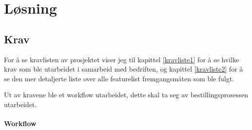 \chapter{Løsning}

\section{Krav}
For å se kravlisten av prosjektet viser jeg til kapittel \ref{kravliste1} for å se hvilke krav som ble utarbeidet i samarbeid med bedriften, og kapittel \ref{kravliste2} for å se den mer detaljerte liste over alle  featurelist fremgangsmåten som ble fulgt.

Ut av kravene ble et workflow utarbeidet, dette skal ta seg av bestillingsprosessen utarbeidet.

\subsubsection{Workflow}
